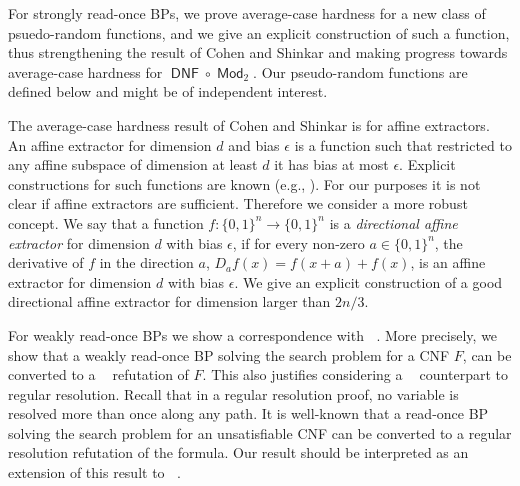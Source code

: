\documentclass[a4paper,11pt,draft]{article}
\theoremstyle{definition}
\theoremstyle{remark}
\DeclareMathOperator{\dnf}{\mathsf{DNF}}
\DeclareMathOperator{\Mod}{\mathsf{Mod}}
\DeclareMathOperator{\reslin}{\mathsf{Res}[\oplus]}
\newcommand{\Q}{{\{0,1\}}}
\newcommand{\sreadonce}{strongly read-once}
\newcommand{\wreadonce}{weakly read-once}
\begin{document}


For \sreadonce{} BPs, we prove average-case hardness for a new class of psuedo-random functions, and we give an explicit construction of such a function, thus strengthening the result of Cohen and Shinkar \cite{DBLP:conf/innovations/CohenS16} and making progress towards average-case hardness for $\dnf \circ \Mod_2$. Our pseudo-random functions are defined below and might be of independent interest.

\bigskip
{} The average-case hardness result of Cohen and Shinkar \cite{DBLP:conf/innovations/CohenS16} is for affine extractors. An affine extractor for dimension $d$ and bias $\epsilon$ is a function such that restricted to any affine subspace of dimension at least $d$ it has bias at most $\epsilon$. Explicit constructions for such functions are known (e.g., \cite{MR2306652,DBLP:journals/combinatorica/Yehudayoff11,DBLP:journals/siamcomp/Ben-SassonK12}). For our purposes it is not clear if affine extractors are sufficient. Therefore we consider a more robust concept. We say that a function $f\colon \Q^n \rightarrow \Q^n$ is a \emph{directional affine extractor} for dimension $d$ with bias $\epsilon$, if for every non-zero $a \in \Q^n$, the derivative of $f$ in the direction $a$, $D_a f(x) = f(x+a) + f(x)$, is an affine extractor for dimension $d$ with bias $\epsilon$. We give an explicit construction of a good directional affine extractor for dimension larger than $2n/3$.



For \wreadonce{} BPs we show a correspondence with $\reslin$. More precisely, we show that a \wreadonce{} BP solving the search problem for a CNF $F$, can be converted to a $\reslin$ refutation of $F$. This also justifies considering a $\reslin$ counterpart to regular resolution. Recall that in a regular resolution proof, no variable is resolved more than once along any path. It is well-known that a read-once BP solving the search problem for an unsatisfiable CNF can be converted to a regular resolution refutation of the formula. Our result should be interpreted as an extension of this result to $\reslin$.



\end{document}
